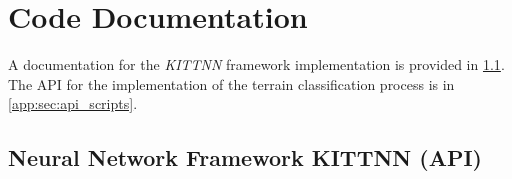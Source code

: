 \chapter{Code Documentation} \label{app:code_documentation}
A documentation for the \textit{KITTNN} framework implementation is provided in \cref{app:sec:api_kitt_nn}. The API for the implementation of the terrain classification process is in \cref{app:sec:api_scripts}.

\section{Neural Network Framework KITTNN (API)} \label{app:sec:api_kitt_nn}

\noindent{}
\\
